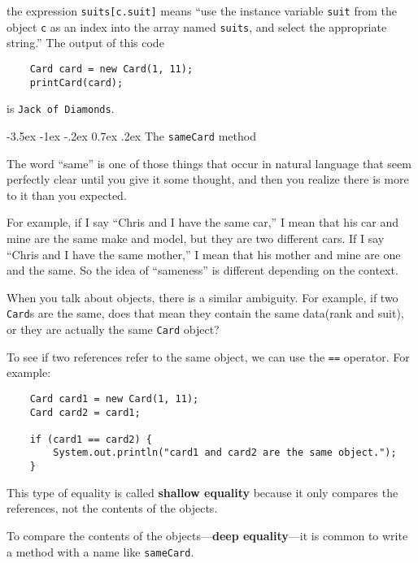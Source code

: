 \documentclass{book}
\makeatletter
\renewcommand{\section}{\@startsection 
    {section} {1} {0mm}%
    {-3.5ex \@plus -1ex \@minus -.2ex}%
    {0.7ex \@plus.2ex}%
    {\normalfont\Large\bfseries}}
\makeatother
\begin{document}
the expression {\tt suits[c.suit]} means ``use the instance variable
{\tt suit} from the object {\tt c} as an index into the array named
{\tt suits}, and select the appropriate string.''  The output of this
code

\begin{verbatim}
    Card card = new Card(1, 11);
    printCard(card);
\end{verbatim}
%
is {\tt Jack of Diamonds}.

\section{The {\tt sameCard} method}

The word ``same'' is one of those things that occur in natural
language that seem perfectly clear until you give it some thought,
and then you realize there is more to it than you expected.


For example, if I say ``Chris and I have the same car,'' I
mean that his car and mine are the same make and model, but they are
two different cars.  If I say ``Chris and I have the same mother,'' I
mean that his mother and mine are one and the same.  So the
idea of ``sameness'' is different depending on the context.

When you talk about objects, there is a similar ambiguity.  For
example, if two {\tt Card}s are the same, does that mean they
contain the same data(rank and suit), or they are actually
the same {\tt Card} object?

To see if two references refer to the same object, we can use
the {\tt ==} operator.  For example:

\begin{verbatim}
    Card card1 = new Card(1, 11);
    Card card2 = card1;

    if (card1 == card2) {
        System.out.println("card1 and card2 are the same object.");
    }
\end{verbatim}
%
This type of equality is called {\bf shallow equality} because
it only compares the references, not the contents of the objects.


To compare the contents of the objects---{\bf deep equality}---it
is common to write a method with a name like {\tt sameCard}.
\end{document}
